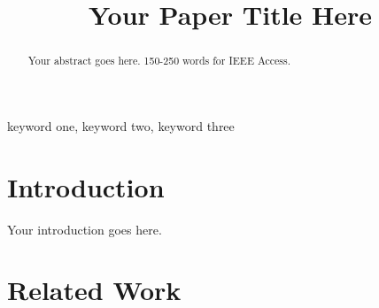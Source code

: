 \documentclass[journal]{IEEEtran}
\begin{document}
\title{Your Paper Title Here}

\author{
}

\maketitle

\begin{abstract}
Your abstract goes here. 150-250 words for IEEE Access.
\end{abstract}

\begin{IEEEkeywords}
keyword one, keyword two, keyword three
\end{IEEEkeywords}

\section{Introduction}
\label{sec:intro}

Your introduction goes here.

\section{Related Work}
\label{sec:related}
\end{document}
